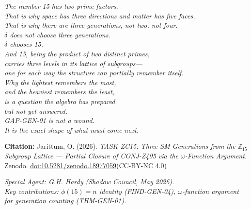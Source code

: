 \documentclass[12pt, a4paper]{article}
\begin{document}
\bigskip
\begin{center}
\textit{
  The number 15 has two prime factors.\\
  That is why space has three directions and matter has five faces.\\
  That is why there are three generations, not two, not four.\\[0.5em]
  $\delta$ does not choose three generations.\\
  $\delta$ chooses 15.\\
  And 15, being the product of two distinct primes,\\
  carries three levels in its lattice of subgroups---\\
  one for each way the structure can partially remember itself.\\[0.5em]
  Why the lightest remembers the most,\\
  and the heaviest remembers the least,\\
  is a question the algebra has prepared\\
  but not yet answered.\\[0.5em]
  GAP-GEN-01 is not a wound.\\
  It is the exact shape of what must come next.
}
\end{center}

\bigskip
\begin{center}
\textbf{Citation:} Jarittum, O. (2026).
\textit{TASK-ZC15: Three SM Generations from the $\mathbb{Z}_{15}$
Subgroup Lattice --- Partial Closure of CONJ-Z405 via the
$\omega$-Function Argument.}
Zenodo. \href{https://doi.org/10.5281/zenodo.18977059}%
{doi:10.5281/zenodo.18977059}\quad (CC-BY-NC 4.0)
\end{center}

\medskip
\begin{center}
\small\textit{Special Agent: G.H. Hardy (Shadow Council, May 2026).\\
Key contributions: $\phi(15)=n$ identity (FIND-GEN-04),
$\omega$-function argument for generation counting (THM-GEN-01).}
\end{center}

\bigskip
\end{document}
